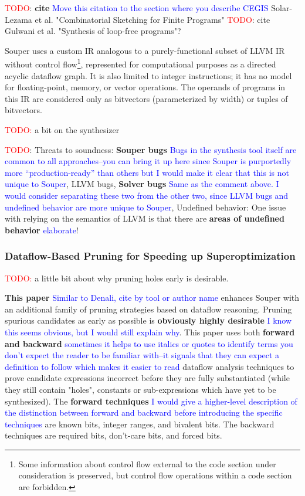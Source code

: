 \documentclass[12pt,twoside]{reedthesis}
\newcommand{\red}[1]{\textcolor{red}{#1}}
\newcommand{\comment}[2]{\textbf{#1} \textcolor{blue}{#2}}
\begin{document}
\red{TODO}: \comment{cite}{Move this citation to the section where you describe CEGIS} Solar-Lezama et al. "Combinatorial Sketching for Finite Programs"
\red{TODO}: cite Gulwani et al. "Synthesis of loop-free programs"?

Souper uses a custom IR analogous to a purely-functional subset of LLVM IR without control flow\footnote{Some information about control flow external to the code section under consideration is preserved, but control flow operations within a code section are forbidden.}, represented for computational purposes as a directed acyclic dataflow graph.
It is also limited to integer instructions; it has no model for floating-point, memory, or vector operations.
The operands of programs in this IR are considered only as bitvectors (parameterized by width) or tuples of bitvectors.

\red{TODO:} a bit on the synthesizer

\red{TODO}: Threats to soundness:
    \comment{Souper bugs}{Bugs in the synthesis tool itself are common to all approaches--you can bring it up here since Souper is purportedly more ``production-ready'' than others but I would make it clear that this is not unique to Souper},
    LLVM bugs,
    \comment{Solver bugs}{Same as the comment above. I would consider separating these two from the other two, since LLVM bugs and undefined behavior are more unique to Souper},
    Undefined behavior: One issue with relying on the semantics of LLVM is that there are \comment{areas of undefined behavior}{elaborate}!

\subsubsection{Dataflow-Based Pruning for Speeding up Superoptimization}
\red{TODO:} a little bit about why pruning holes early is desirable.

\comment{This paper}{Similar to Denali, cite by tool or author name} \cite{mukherjee2020dataflow} enhances Souper with an additional family of pruning strategies based on dataflow reasoning. 
Pruning spurious candidates as early as possible is \comment{obviously highly desirable}{I know this seems obvious, but I would still explain why}.
This paper uses both \comment{forward and backward}{sometimes it helps to use italics or quotes to identify terms you don't expect the reader to be familiar with--it signals that they can expect a definition to follow which makes it easier to read} dataflow analysis techniques to prove candidate expressions incorrect before they are fully substantiated (while they still contain "holes", constants or sub-expressions which have yet to be synthesized).
The \comment{forward techniques}{I would give a higher-level description of the distinction between forward and backward before introducing the specific techniques} are known bits,
                           integer ranges, and
                           bivalent bits.
The backward techniques are required bits,
                            don't-care bits, and
                            forced bits.
\end{document}
